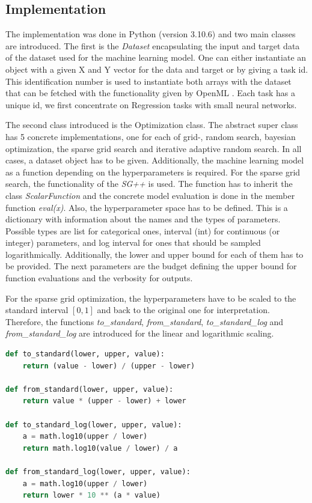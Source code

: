 \subsection{Implementation}
\label{subsec:Implementation}

The implementation was done in Python (version 3.10.6) and two main classes are introduced. The first is the \textit{Dataset} encapsulating the input and target data of the dataset used for the machine learning model. One can either instantiate an object with a given X and Y vector for the data and target or by giving a task id. This identification number is used to instantiate both arrays with the dataset that can be fetched with the functionality given by OpenML \cite{feurer-arxiv19a}. Each task has a unique id, we first concentrate on Regression tasks with small neural networks. \newline

The second class introduced is the Optimization class. The abstract super class has 5 concrete implementations, one for each of grid-, random search, bayesian optimization, the sparse grid search and iterative adaptive random search. In all cases, a dataset object has to be given. Additionally, the machine learning model as a function depending on the hyperparameters is required. For the sparse grid search, the functionality of the \textit{SG++} \cite{valentin2016hierarchical} is used. The function has to inherit the class \textit{ScalarFunction} and the concrete model evaluation is done in the member function \textit{eval(x)}. Also, the hyperparameter space has to be defined. This is a dictionary with information about the names and the types of parameters. Possible types are list for categorical ones, interval (int) for continuous (or integer) parameters, and log interval for ones that should be sampled logarithmically. Additionally, the lower and upper bound for each of them has to be provided. The next parameters are the budget defining the upper bound for function evaluations and the verbosity for outputs. \newline

For the sparse grid optimization, the hyperparameters have to be scaled to the standard interval $ [0,1] $ and back to the original one for interpretation. Therefore, the functions \textit{to\_standard}, \textit{from\_standard}, \textit{to\_standard\_log} and \textit{from\_standard\_log} are introduced for the linear and logarithmic scaling. 

\begin{lstlisting}[language=Python]
def to_standard(lower, upper, value):
	return (value - lower) / (upper - lower)
	
def from_standard(lower, upper, value):
	return value * (upper - lower) + lower
	
def to_standard_log(lower, upper, value):
	a = math.log10(upper / lower)
	return math.log10(value / lower) / a	
	
def from_standard_log(lower, upper, value):
	a = math.log10(upper / lower)
	return lower * 10 ** (a * value)
\end{lstlisting}

